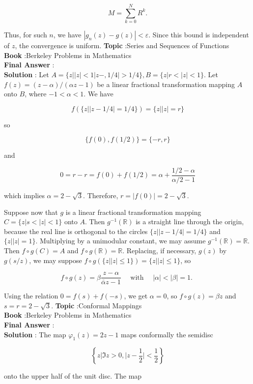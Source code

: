 \documentclass[10pt]{article}
\begin{document}
$$
M=\sum_{k=0}^{N} R^{k} .
$$

Thus, for such $n$, we have $\left|g_{n}(z)-g(z)\right|<\varepsilon$. Since this bound is independent of $z$, the convergence is uniform.
\textbf{Topic} :Series and Sequences of Functions \\
\textbf{Book} :Berkeley Problems in Mathematics\\
\textbf{Final Answer} :\\


\textbf{Solution} : Let $A=\{z|| z|<1| z-,1 / 4 \mid>1 / 4\}, B=\{z|r<| z \mid<1\}$. Let $f(z)=(z-\alpha) /(\alpha z-1)$ be a linear fractional transformation mapping $A$ onto $B$, where $-1<\alpha<1$. We have

$$
f(\{z|| z-1 / 4 \mid=1 / 4\})=\{z|| z \mid=r\}
$$

so

$$
\{f(0), f(1 / 2)\}=\{-r, r\}
$$

and

$$
0=r-r=f(0)+f(1 / 2)=\alpha+\frac{1 / 2-\alpha}{\alpha / 2-1}
$$

which implies $\alpha=2-\sqrt{3}$. Therefore, $r=|f(0)|=2-\sqrt{3}$.

Suppose now that $g$ is a linear fractional transformation mapping $C=\{z|s<| z \mid<1\}$ onto $A$. Then $g^{-1}(\mathbb{R})$ is a straight line through the origin, because the real line is orthogonal to the circles $\{z|| z-1 / 4 \mid=1 / 4\}$ and $\{z|| z \mid=1\}$. Multiplying by a unimodular constant, we may assume $g^{-1}(\mathbb{R})=\mathbb{R}$. Then $f \circ g(C)=A$ and $f \circ g(\mathbb{R})=\mathbb{R}$. Replacing, if necessary, $g(z)$ by $g(s / z)$, we may suppose $f \circ g(\{z|| z \mid \leqslant 1\})=\{z|| z \mid \leqslant 1\}$, so

$$
f \circ g(z)=\beta \frac{z-\alpha}{\bar{\alpha} z-1} \quad \text { with } \quad|\alpha|<|\beta|=1 \text {. }
$$

Using the relation $0=f(s)+f(-s)$, we get $\alpha=0$, so $f \circ g(z)=\beta z$ and $s=r=2-\sqrt{3}$.
\textbf{Topic} :Conformal Mappings \\
\textbf{Book} :Berkeley Problems in Mathematics\\
\textbf{Final Answer} :\\


\textbf{Solution} : The map $\varphi_{1}(z)=2 z-1$ maps conformally the semidisc

$$
\left\{z|\mathfrak{I} z>0,| z-\frac{1}{2} \mid<\frac{1}{2}\right\}
$$

onto the upper half of the unit disc. The map
\end{document}

